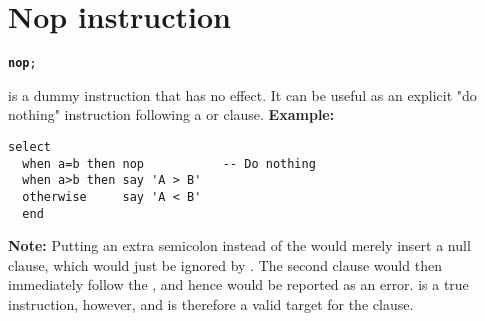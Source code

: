 \section{Nop instruction}
\begin{shaded}
\begin{alltt}
\textbf{nop};
\end{alltt}
\end{shaded}
  is a dummy instruction that has no effect.  It can be
useful as an explicit "do nothing" instruction following a
 or  clause.
 \textbf{Example:}
\begin{lstlisting}
select
  when a=b then nop           -- Do nothing
  when a>b then say 'A > B'
  otherwise     say 'A < B'
  end
\end{lstlisting}
\begin{shaded}\noindent
\textbf{Note: }Putting an extra semicolon instead of the  would
merely insert a null clause, which would just be ignored by \nr{}.
The second  clause would then immediately follow the
, and hence would be reported as an error.
 is a true instruction, however, and is therefore a valid
target for the  clause.
\end{shaded}\indent